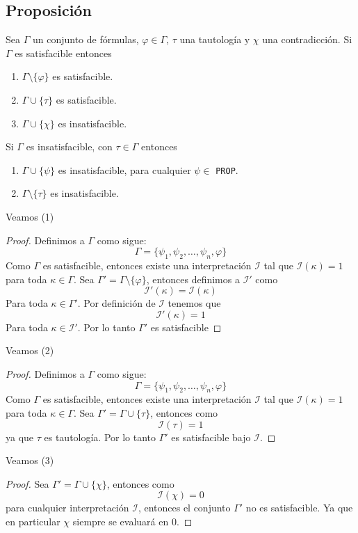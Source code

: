 \documentclass[a4paper]{article}
\begin{document}
\subsection{Proposición}
Sea $\Gamma$ un conjunto de fórmulas, $\varphi \in \Gamma$, $\tau$ una 
tautología y $\chi$ una contradicción. 
Si \(\Gamma\) es satisfacible entonces
\begin{enumerate}
    \item $\Gamma\setminus\{\varphi\}$ es satisfacible.
    \item $\Gamma\cup\{\tau\}$ es satisfacible.
    \item $\Gamma\cup\{\chi\}$ es insatisfacible.
\end{enumerate}
Si \(\Gamma\) es insatisfacible, con \(\tau \in \Gamma\) entonces
\begin{enumerate}
    \item $\Gamma\cup\{\psi\}$ es insatisfacible, para cualquier \(\psi \in\) \texttt{PROP}.
    \item $\Gamma\setminus\{\tau\}$ es insatisfacible.
\end{enumerate}
Veamos (1)
\begin{proof}
    Definimos a \(\Gamma\) como sigue:
    \[
        \Gamma = \{
            \psi_{1}, \psi_{2}, \dotsc, \psi_{n}, \varphi
        \}  
    \]
    Como \(\Gamma\) es satisfacible, entonces existe una interpretación \(\mathcal{I}\) 
    tal que \(\mathcal{I}\left(\kappa\right) = 1\) para toda \(\kappa \in \Gamma\).
    \newline 
    Sea \(\Gamma' = \Gamma \setminus \{\varphi\}\), entonces definimos a \(\mathcal{I}'\)
    como 
    \[
        \mathcal{I}'\left(\kappa\right) = \mathcal{I}\left(\kappa\right)
    \]
    Para toda \(\kappa \in \Gamma'\). Por definición de \(\mathcal{I}\) tenemos que
    \[
        \mathcal{I}'\left(\kappa\right) = 1
    \]
    Para toda \(\kappa \in \mathcal{I}'\). Por lo tanto \(\Gamma'\) es satisfacible
\end{proof}
Veamos (2)
\begin{proof}
    Definimos a \(\Gamma\) como sigue:
    \[
        \Gamma = \{
            \psi_{1}, \psi_{2}, \dotsc, \psi_{n}, \varphi
        \}  
    \]
    Como \(\Gamma\) es satisfacible, entonces existe una interpretación \(\mathcal{I}\) 
    tal que \(\mathcal{I}\left(\kappa\right) = 1\) para toda \(\kappa \in \Gamma\).
    \newline 
    Sea \(\Gamma' = \Gamma \cup \{\tau\}\), entonces
    como 
    \[
        \mathcal{I}\left(\tau\right) = 1
    \]
    ya que \(\tau\) es tautología. Por lo tanto \(\Gamma'\) es satisfacible bajo \(\mathcal{I}\).
\end{proof}
Veamos (3)
\newline
\begin{proof}
    Sea \(\Gamma' = \Gamma \cup \{\chi\}\), entonces
    como 
    \[
        \mathcal{I}\left(\chi\right) = 0
    \]
    para cualquier interpretación \(\mathcal{I}\), entonces el conjunto \(\Gamma'\) no es satisfacible.
    Ya que en particular \(\chi\) siempre se evaluará en \(0\).
\end{proof}
\newpage
\end{document}
